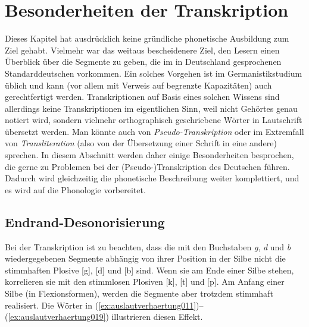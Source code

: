 \section{Besonderheiten der Transkription}
\label{sec:besonderheitendertranskription}


Dieses Kapitel hat ausdrücklich keine gründliche phonetische Ausbildung zum Ziel gehabt.
Vielmehr war das weitaus bescheidenere Ziel, den Lesern einen Überblick über die Segmente zu geben, die im in Deutschland gesprochenen Standarddeutschen vorkommen.
Ein solches Vorgehen ist im Germanistikstudium üblich und kann (vor allem mit Verweis auf begrenzte Kapazitäten) auch gerechtfertigt werden.
Transkriptionen auf Basis eines solchen Wissens sind allerdings keine Transkriptionen im eigentlichen Sinn, weil nicht Gehörtes genau notiert wird, sondern vielmehr orthographisch geschriebene Wörter in Lautschrift übersetzt werden.
Man könnte auch von \textit{Pseudo-Transkription} oder im Extremfall von \textit{Transliteration} (also von der Übersetzung einer Schrift in eine andere) sprechen.
In diesem Abschnitt werden daher einige Besonderheiten besprochen, die gerne zu Problemen bei der (Pseudo-)Transkription des Deutschen führen.
Dadurch wird gleichzeitig die phonetische Beschreibung weiter komplettiert, und es wird auf die Phonologie vorbereitet.

\subsection{Endrand-Desonorisierung}
\label{sec:endranddesonorisierung1}


Bei der Transkription ist zu beachten, dass die mit den Buchstaben \textit{g}, \textit{d} und \textit{b} wiedergegebenen Segmente abhängig von ihrer Position in der Silbe nicht die stimmhaften Plosive [g], [d] und [b] sind.
Wenn sie am Ende einer Silbe stehen, korrelieren sie mit den stimmlosen Plosiven [k], [t] und [p].
Am Anfang einer Silbe (\zB in Flexionsformen), werden die Segmente aber trotzdem stimmhaft realisiert.
Die Wörter in (\ref{ex:auslautverhaertung011})--(\ref{ex:auslautverhaertung019}) illustrieren diesen Effekt.

